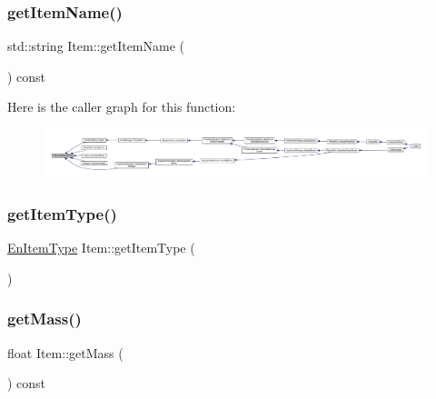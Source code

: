 \mbox{\label{class_item_a806159273f1f9fbb07fe75a74f2f51c5}} 
\subsubsection{\texorpdfstring{get\+Item\+Name()}{getItemName()}}
{\footnotesize\ttfamily std\+::string Item\+::get\+Item\+Name (\begin{DoxyParamCaption}{ }\end{DoxyParamCaption}) const}

Here is the caller graph for this function\+:
\nopagebreak
\begin{figure}[H]
\begin{center}
\leavevmode
\includegraphics[width=350pt]{dc/d32/class_item_a806159273f1f9fbb07fe75a74f2f51c5_icgraph}
\end{center}
\end{figure}
\mbox{\label{class_item_aa8320312184b0cbf28d047d68059f1b1}} 
\subsubsection{\texorpdfstring{get\+Item\+Type()}{getItemType()}}
{\footnotesize\ttfamily \mbox{\hyperlink{_equipment_8hpp_a3c7fe24829a0b210a1a4d36e29ac01c6}{En\+Item\+Type}} Item\+::get\+Item\+Type (\begin{DoxyParamCaption}{ }\end{DoxyParamCaption})}

\mbox{\label{class_item_a452c0983b99f1b148949274b63ed79fd}} 
\subsubsection{\texorpdfstring{get\+Mass()}{getMass()}}
{\footnotesize\ttfamily float Item\+::get\+Mass (\begin{DoxyParamCaption}{ }\end{DoxyParamCaption}) const}

